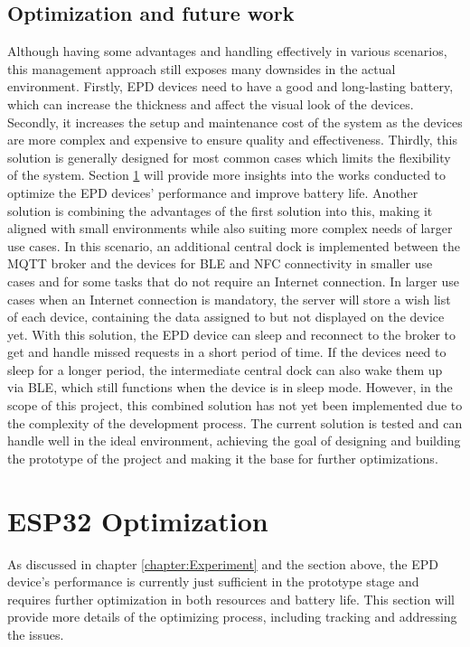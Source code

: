 \documentclass[../Main.tex]{subfiles}
\begin{document}
\subsection{Optimization and future work}
Although having some advantages and handling effectively in various scenarios, this management approach still exposes many downsides in the actual environment. Firstly, \gls{EPD} devices need to have a good and long-lasting battery, which can increase the thickness and affect the visual look of the devices. Secondly, it increases the setup and maintenance cost of the system as the devices are more complex and expensive to ensure quality and effectiveness. Thirdly, this solution is generally designed for most common cases which limits the flexibility of the system. Section \ref{section:optimization} will provide more insights into the works conducted to optimize the \gls{EPD} devices' performance and improve battery life. Another solution is combining the advantages of the first solution into this, making it aligned with small environments while also suiting more complex needs of larger use cases. In this scenario, an additional central dock is implemented between the MQTT broker and the devices for BLE and NFC connectivity in smaller use cases and for some tasks that do not require an Internet connection. In larger use cases when an Internet connection is mandatory, the server will store a wish list of each device, containing the data assigned to but not displayed on the device yet. With this solution, the \gls{EPD} device can sleep and reconnect to the broker to get and handle missed requests in a short period of time. If the devices need to sleep for a longer period, the intermediate central dock can also wake them up via BLE, which still functions when the device is in sleep mode. However, in the scope of this project, this combined solution has not yet been implemented due to the complexity of the development process. The current solution is tested and can handle well in the ideal environment, achieving the goal of designing and building the prototype of the project and making it the base for further optimizations.

\section{ESP32 Optimization}
\label{section:optimization}
As discussed in chapter \ref{chapter:Experiment} and the section above, the \gls{EPD} device's performance is currently just sufficient in the prototype stage and requires further optimization in both resources and battery life. This section will provide more details of the optimizing process, including tracking and addressing the issues.
\end{document}
